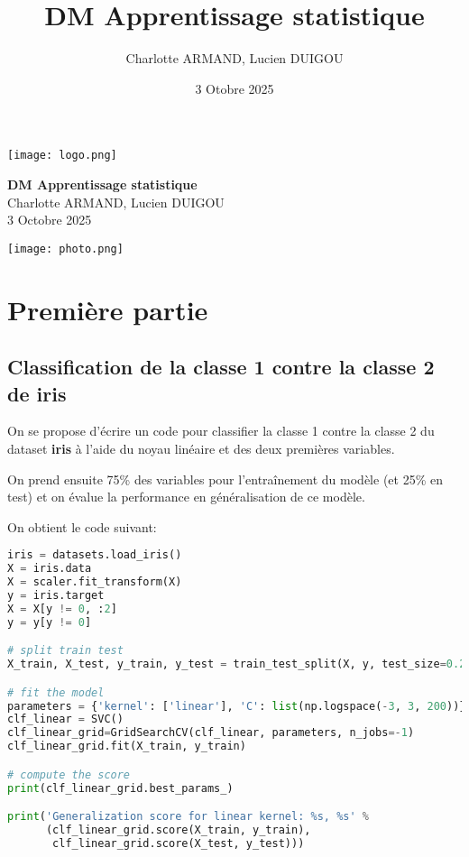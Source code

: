 \documentclass[a4paper, 12pt]{article}
\title{DM Apprentissage statistique}
\author{Charlotte ARMAND, Lucien DUIGOU}
\date{3 Otobre 2025}
\begin{document}
\begin{flushleft}
    \texttt{[image: logo.png]}
\end{flushleft}

\vspace{2cm}

\begin{center}
    \Huge\textbf{DM Apprentissage statistique} \\[2em]
    \Large Charlotte ARMAND, Lucien DUIGOU \\[1em]
    \large 3 Octobre 2025 
\end{center}

\vspace{3cm}

\begin{center}
    \texttt{[image: photo.png]}
\end{center}


\newpage

\tableofcontents
\newpage


\section{Première partie } \label{sec:I}

\subsection{Classification de la classe 1 contre la classe 2 de \textbf{iris}} \label{subsec:classification}


\>\>\>\>\> On se propose d'écrire un code pour classifier la classe 1 contre la classe 2 du dataset \textbf{iris} à l'aide du noyau linéaire et des deux premières variables.

On prend ensuite 75\% des variables pour l'entraînement du modèle (et 25\% en test) et on évalue la performance en généralisation de ce modèle. 

On obtient le code suivant:

\begin{lstlisting}[language=Python, caption=Classification]
iris = datasets.load_iris()
X = iris.data
X = scaler.fit_transform(X)
y = iris.target
X = X[y != 0, :2]
y = y[y != 0]

# split train test
X_train, X_test, y_train, y_test = train_test_split(X, y, test_size=0.25, random_state=0)

# fit the model
parameters = {'kernel': ['linear'], 'C': list(np.logspace(-3, 3, 200))}
clf_linear = SVC()
clf_linear_grid=GridSearchCV(clf_linear, parameters, n_jobs=-1)
clf_linear_grid.fit(X_train, y_train)

# compute the score
print(clf_linear_grid.best_params_)

print('Generalization score for linear kernel: %s, %s' %
      (clf_linear_grid.score(X_train, y_train),
       clf_linear_grid.score(X_test, y_test)))

\end{lstlisting}
\end{document}
